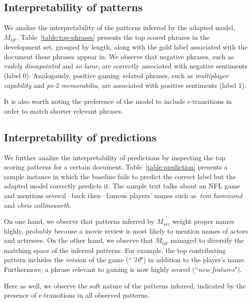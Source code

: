 \documentclass[11pt,a4paper]{article}
\begin{document}
\subsection{Interpretability of patterns}
We analize the interpretability of the patterns inferred by the adapted model, $M_{tgt}$.
Table~\ref{table:top-phrases} presents the top scored phrases in the development set, grouped by length, along with the gold label associated with the document these phrases appear in.
We observe that negative phrases, such as {\it rudely dissapointed} and {\it so lame}, are correctly associated with negative sentiments (label 0). 
Analogously, positive gaming--related phrases, such as {\it multiplayer capability} and {\it ps-2 memorabilia}, are associated with positive sentiments (label 1).

It is also worth noting the preference of the model to include $\epsilon$-transitions in order to match shorter relevant phrases.

\subsection{Interpretability of predictions}
We futther analize the interpretability of predictions by inspecting the top scoring patterns for a certain document.
Table~\ref{table:prediction} presents a sample instance in which the baseline fails to predict the correct label but the adapted model correctly predicts it.
The sample text talks about an NFL game and mentions several --back then-- famous players' names such as\ {\it tom hammond} and {\it chris collinsworth}.

On one hand, we observe that patterns inferred by $M_{src}$ weight proper names highly, probably because a movie review is most likely to mention names of actors and actresses.
On the other hand, we observe that $M_{tgt}$ managed to diversify the matching space of the inferred patterns. For example, the top contributing pattern includes the version of the game (``{\it '10}") in addition to the player's name. Furthermore, a phrase relevant to gaming is now highly scored (``{\it new features}").

Here as well, we observe the soft nature of the patterns inferred, indicated by the presence of $\epsilon$-transitions in all observed patterns.
\end{document}
